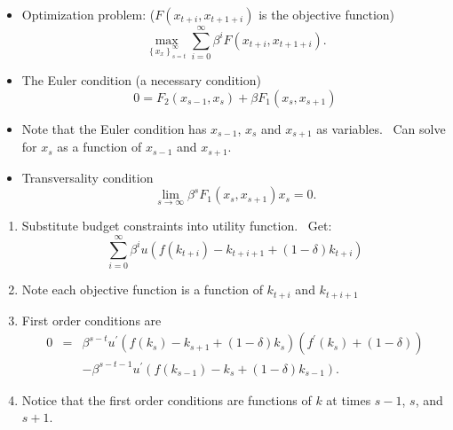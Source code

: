 \documentclass[notes=show]{beamer}
\begin{document}
\begin{frame}%


\begin{itemize}
\item Optimization problem: ($F\left( x_{t+i},x_{t+1+i}\right) $ is the
objective function)%
\[
\max_{\left\{ x_{x}\right\} _{s=t}^{\infty }}\sum_{i=0}^{\infty }\beta
^{i}F\left( x_{t+i},x_{t+1+i}\right) . 
\]

\item The Euler condition (a necessary condition) 
\[
0=F_{2}\left( x_{s-1},x_{s}\right) +\beta F_{1}\left( x_{s},x_{s+1}\right) 
\]

\item Note that the Euler condition has $x_{s-1}$, $x_{s}$ and $x_{s+1}$ as
variables. \ Can solve for $x_{s}$ as a function of $x_{s-1}$ and $x_{s+1}$.

\item Transversality condition 
\[
\lim_{s\rightarrow \infty }\beta ^{s}F_{1}\left( x_{s},x_{s+1}\right)
x_{s}=0. 
\]
\end{itemize}

\end{frame}%

\begin{frame}%


\begin{enumerate}
\item Substitute budget constraints into utility function. \ Get:%
\[
\sum_{i=0}^{\infty }\beta ^{i}u(f(k_{t+i})-k_{t+i+1}+(1-\delta )k_{t+i}) 
\]

\item Note each objective function is a function of $k_{t+i}$ and $k_{t+i+1}$

\item First order conditions are%
\begin{eqnarray*}
0 &=&\beta ^{s-t}u^{\prime }(f(k_{s})-k_{s+1}+(1-\delta )k_{s})\left(
f^{\prime }(k_{s})+(1-\delta )\right) \\
&&-\beta ^{s-t-1}u^{\prime }(f(k_{s-1})-k_{s}+(1-\delta )k_{s-1}).
\end{eqnarray*}

\item Notice that the first order conditions are functions of $k$ at times $%
s-1$, $s$, and $s+1$.
\end{enumerate}

\end{frame}%
\end{document}
